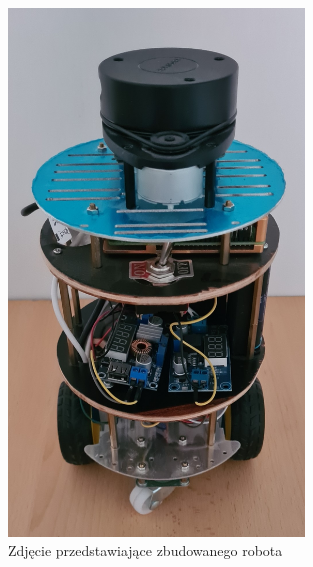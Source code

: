\documentclass[a4paper,twoside,12pt]{book}
\begin{document}
\begin{figure}[!hb]
	\centering
	\includegraphics[width=0.7\textwidth]{images/robot.jpg}
	\caption{Zdjęcie przedstawiające zbudowanego robota}
	\label{fig:robot-zdj}
	\end{figure}
	\newpage
\end{document}
